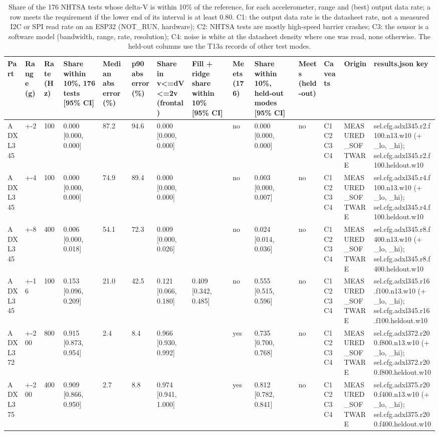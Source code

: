 \begin{table}[t]
\centering
\small
\caption{Share of the 176 NHTSA tests whose delta-V is within 10\% of the reference, for each accelerometer, range and (best) output data rate; a row meets the requirement if the lower end of its interval is at least 0.80. C1: the output data rate is the datasheet rate, not a measured I2C or SPI read rate on an ESP32 (NOT\_RUN, hardware); C2: NHTSA tests are mostly high-speed barrier crashes; C3: the sensor is a software model (bandwidth, range, rate, resolution); C4: noise is white at the datasheet density where one was read, none otherwise. The held-out columns use the T13a records of other test modes.}
\label{tab:tab_sel_study}
\begin{tabular}{llllllllllllll}
\toprule
Part & Range (g) & Rate (Hz) & Share within 10\%, 176 tests [95\% CI] & Median abs error (\%) & p90 abs error (\%) & Share in v<=dV<=2v (frontal) & Fill + ridge share within 10\% [95\% CI] & Meets (176) & Share within 10\%, held-out modes [95\% CI] & Meets (held-out) & Caveats & Origin & results.json key \\
\midrule
ADXL345 & +-2 & 100 & 0.000 [0.000, 0.000] & 87.2 & 94.6 & 0.000 [0.000, 0.000] &  & no & 0.000 [0.000, 0.000] & no & C1 C2 C3 C4 & MEASURED\_SOFTWARE & sel.cfg.adxl345.r2.f100.n13.w10 (+ \_lo, \_hi); sel.cfg.adxl345.r2.f100.heldout.w10 \\
ADXL345 & +-4 & 100 & 0.000 [0.000, 0.000] & 74.9 & 89.4 & 0.000 [0.000, 0.000] &  & no & 0.003 [0.000, 0.007] & no & C1 C2 C3 C4 & MEASURED\_SOFTWARE & sel.cfg.adxl345.r4.f100.n13.w10 (+ \_lo, \_hi); sel.cfg.adxl345.r4.f100.heldout.w10 \\
ADXL345 & +-8 & 400 & 0.006 [0.000, 0.018] & 54.1 & 72.3 & 0.009 [0.000, 0.026] &  & no & 0.024 [0.014, 0.036] & no & C1 C2 C3 C4 & MEASURED\_SOFTWARE & sel.cfg.adxl345.r8.f400.n13.w10 (+ \_lo, \_hi); sel.cfg.adxl345.r8.f400.heldout.w10 \\
ADXL345 & +-16 & 100 & 0.153 [0.096, 0.209] & 21.0 & 42.5 & 0.121 [0.066, 0.180] & 0.409 [0.342, 0.485] & no & 0.555 [0.515, 0.596] & no & C1 C2 C3 C4 & MEASURED\_SOFTWARE & sel.cfg.adxl345.r16.f100.n13.w10 (+ \_lo, \_hi); sel.cfg.adxl345.r16.f100.heldout.w10 \\
ADXL372 & +-200 & 800 & 0.915 [0.873, 0.954] & 2.4 & 8.4 & 0.966 [0.930, 0.992] &  & yes & 0.735 [0.700, 0.768] & no & C1 C2 C3 C4 & MEASURED\_SOFTWARE & sel.cfg.adxl372.r200.f800.n13.w10 (+ \_lo, \_hi); sel.cfg.adxl372.r200.f800.heldout.w10 \\
ADXL375 & +-200 & 400 & 0.909 [0.866, 0.950] & 2.7 & 8.8 & 0.974 [0.941, 1.000] &  & yes & 0.812 [0.782, 0.841] & no & C1 C2 C3 C4 & MEASURED\_SOFTWARE & sel.cfg.adxl375.r200.f400.n13.w10 (+ \_lo, \_hi); sel.cfg.adxl375.r200.f400.heldout.w10 \\

\end{tabular}
\end{table}
